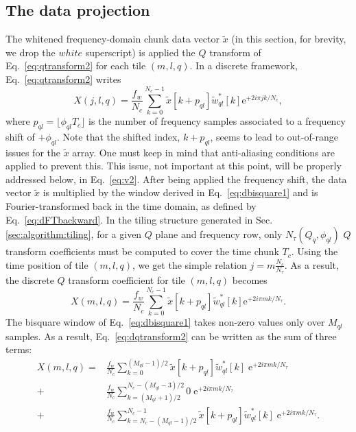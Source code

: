 \subsection{The data projection} \label{sec:algorithm:projection}

The whitened frequency-domain chunk data vector $\tilde{x}$ (in this section, for brevity, we drop the $white$ superscript) is applied the $Q$ transform of Eq.~\ref{eq:qtransform2} for each tile $(m, l, q)$. In a discrete framework, Eq.~\ref{eq:qtransform2} writes
\begin{equation}
  X(j,l,q)=\frac{f_w}{N_c}\sum_{k=0}^{N_c-1}{\tilde{x}[k+p_{ql}]\tilde{w}_{ql}^*[k]\mathrm{e}^{+2i\pi jk/N_c}},
  \label{eq:dqtransform1}
\end{equation}
where $p_{ql}=\lfloor \phi_{ql}T_c \rfloor$ is the number of frequency samples associated to a frequency shift of $+\phi_{ql}$. Note that the shifted index, $k+p_{ql}$, seems to lead to out-of-range issues for the $\tilde{x}$ array. One must keep in mind that anti-aliasing conditions are applied to prevent this. This issue, not important at this point, will be properly addressed below, in Eq.~\ref{eq:v2}. After being applied the frequency shift, the data vector $\tilde{x}$ is multiplied by the window derived in Eq.~\ref{eq:dbisquare1} and is Fourier-transformed back in the time domain, as defined by Eq.~\ref{eq:dFTbackward}. In the tiling structure generated in Sec.\ref{sec:algorithm:tiling}, for a given $Q$ plane and frequency row, only $N_\tau(Q_q, \phi_{ql})$ $Q$ transform coefficients must be computed to cover the time chunk $T_c$. Using the time position of tile $(m,l,q)$, we get the simple relation $j=m\frac{N_c}{N_\tau}$. As a result, the discrete $Q$ transform coefficient for tile $(m,l,q)$ becomes
\begin{equation}
  X(m, l, q) = \frac{f_w}{N_c}\sum_{k=0}^{N_c-1}{\tilde{x}[k+p_{ql}]\tilde{w}_{ql}^*[k]\mathrm{e}^{+2i\pi mk/N_\tau}}.
  \label{eq:dqtransform2}
\end{equation}
The bisquare window of Eq.~\ref{eq:dbisquare1} takes non-zero values only over $M_{ql}$ samples. As a result, Eq.~\ref{eq:dqtransform2} can be written as the sum of three terms:
\begin{align}
  X(m, l, q)
  = & \frac{f_w}{N_c} \sum_{k=0}^{(M_{ql}-1)/2}{\tilde{x}[k+p_{ql}]\tilde{w}_{ql}^*[k] \; \mathrm{e}^{+2i\pi mk/N_\tau}} \\
  + & \frac{f_w}{N_c} \sum_{k=(M_{ql}+1)/2}^{N_c-(M_{ql}-3)/2}{0 \; \mathrm{e}^{+2i\pi mk/N_\tau}} \\
  + & \frac{f_w}{N_c} \sum_{k=N_c-(M_{ql}-1)/2}^{N_c-1}{\tilde{x}[k+p_{ql}]\tilde{w}_{ql}^*[k] \; \mathrm{e}^{+2i\pi mk/N_\tau}} .
  \label{eq:dqtransform3}
\end{align}
